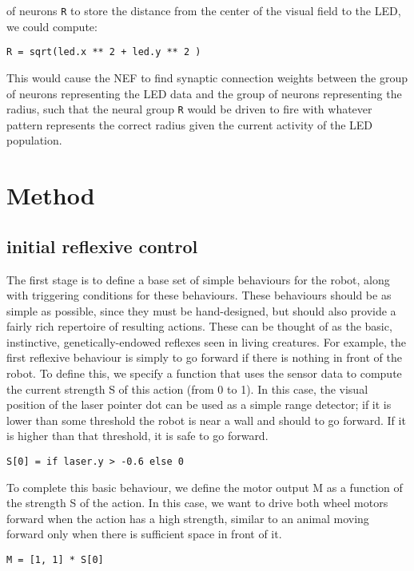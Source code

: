 \documentclass[conference]{IEEEtran}
\begin{document}
of neurons \texttt{R} to store the distance from the center of the visual field to the LED, we could compute: 
\begin{lstlisting}
R = sqrt(led.x ** 2 + led.y ** 2 )
\end{lstlisting}

This would cause the NEF to find synaptic connection weights between the group of neurons representing the LED data and the group of neurons representing the radius, such that the neural group \texttt{R} would be driven to fire with whatever pattern represents the correct radius given the
current activity of the LED population.

\section{Method}
\subsection{initial reflexive control}
The first stage is to define a base set of simple behaviours for the robot, along with triggering conditions for these behaviours. These behaviours should be as simple as possible, since they must be hand-designed, but should also provide a fairly rich repertoire of resulting actions. These can be thought of as the basic, instinctive, genetically-endowed reflexes seen in living creatures. For example, the first reflexive behaviour is simply to go forward if there is nothing in front of the robot. To define this, we specify a function that uses the sensor data to compute the current strength S of this action (from 0 to 1). In this case, the visual position of the laser pointer dot can be used as a simple range detector; if it is lower than some threshold the robot is near a wall and should to go forward. If it is higher than that threshold, it is safe to go forward. 
\begin{lstlisting}
S[0] = if laser.y > -0.6 else 0
\end{lstlisting}

To complete this basic behaviour, we define the motor output M as a function of the strength S of the action. In this case, we want to drive both wheel motors forward when the action has a high strength, similar to an animal moving forward only when there is sufficient space in front of it.

\begin{lstlisting}
M = [1, 1] * S[0]
\end{lstlisting}
\end{document}
